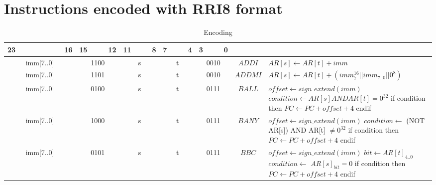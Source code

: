 \section{Instructions encoded with RRI8 format}
\begin{smalltables}
	\begin{longtable}{llllllllllllllllllllllll  p{1cm}  p{7cm} | }
		\caption{Encoding\label{long}}\\
		23 & & & & & & & 16 & 15 & & & 12 & 11 & & & 8 & 7 & & & 4 & 3 & & & 0 & & \multicolumn{1}{c}{}\\
		\hline
        \endhead
		\multicolumn{8}{|c|}{imm[7..0]} & \multicolumn{4}{c|}{1100} & \multicolumn{4}{c|}{s} & \multicolumn{4}{c|}{t} & \multicolumn{4}{c|}{0010} & \multicolumn{1}{c|}{$ADDI$} & $AR[s] \leftarrow AR[t] + imm$ \\ \hline
		\multicolumn{8}{|c|}{imm[7..0]} & \multicolumn{4}{c|}{1101} & \multicolumn{4}{c|}{s} & \multicolumn{4}{c|}{t} & \multicolumn{4}{c|}{0010} & \multicolumn{1}{c|}{$ADDMI$} & $AR[s] \leftarrow AR[t] + (imm_7^{16} || imm_{7..0} || 0^8)$ \\ \hline
		\multicolumn{8}{|c|}{imm[7..0]} & \multicolumn{4}{c|}{0100} & \multicolumn{4}{c|}{s} & \multicolumn{4}{c|}{t} & \multicolumn{4}{c|}{0111} & \multicolumn{1}{c|}{$BALL$} & $offset \leftarrow sign\_extend(imm)$ \newline $condition \leftarrow AR[s] AND AR[t] = 0^{32}$ \newline if condition then \newline $PC \leftarrow PC + offset + 4$ \newline endif\\ \hline
		\multicolumn{8}{|c|}{imm[7..0]} & \multicolumn{4}{c|}{1000} & \multicolumn{4}{c|}{s} & \multicolumn{4}{c|}{t} & \multicolumn{4}{c|}{0111} & \multicolumn{1}{c|}{$BANY$} & $offset \leftarrow sign\_extend(imm)$ \newline  $condition \leftarrow$ (NOT AR[s]) AND AR[t] $\neq 0^{32}$ \newline if condition then \newline $PC \leftarrow PC + offset + 4$ \newline endif\\ \hline
		\multicolumn{8}{|c|}{imm[7..0]} & \multicolumn{4}{c|}{0101} & \multicolumn{4}{c|}{s} & \multicolumn{4}{c|}{t} & \multicolumn{4}{c|}{0111} & \multicolumn{1}{c|}{$BBC$} & $offset \leftarrow sign\_extend(imm)$ \newline $bit \leftarrow AR[t]_{4..0}$ \newline $condition \leftarrow$ $AR[s]_{bit} = 0$ \newline if condition then \newline $PC \leftarrow PC + offset + 4$ \newline endif\\ \hline

\end{longtable}
\end{smalltables}
